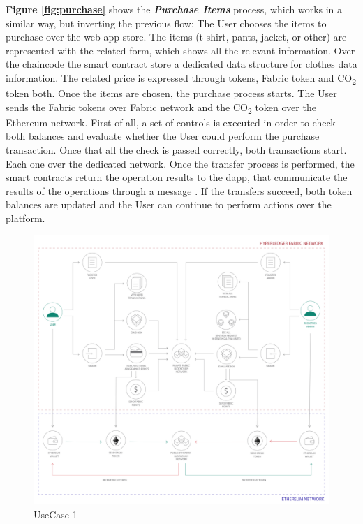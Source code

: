\begin{outline}[enumerate]
    \1 \textbf{Figure \ref{fig:purchase}} shows the \textit{\bf{Purchase Items}} process, which works in a similar way, but inverting the previous flow:
    \2 The User chooses the items to purchase over the web-app store. The items (t-shirt, pants, jacket, or other) 
    are represented with the related form, which shows all the relevant information. Over the chaincode the smart 
    contract store a dedicated data structure for clothes data information. The related price is expressed through 
    tokens, Fabric token and CO\textsubscript{2} token both. 
    \2 Once the items are chosen, the purchase process starts. The User sends the Fabric tokens over Fabric network 
    and the CO\textsubscript{2} token over the Ethereum network. First of all, a set of controls is executed 
    in order to check both balances and evaluate whether the User could perform the purchase transaction. Once that all 
    the check is passed correctly, both transactions start.
    Each one over the dedicated network. Once the transfer process is performed, the smart contracts return the 
    operation results to the dapp, that communicate the results of the operations through a message .
    \2 If the transfers succeed, both token balances are updated and the User can
    continue to perform actions over the platform.    
\end{outline}

\begin{figure}[h!]
	\centering
	\includegraphics[totalheight=15cm]{img/use_case1.png}
	\caption{UseCase 1}
	\label{fig:usecase1}
\end{figure}

